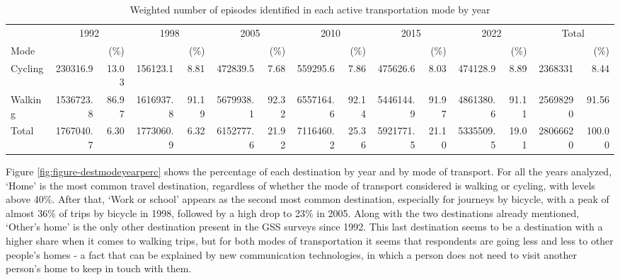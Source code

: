 \documentclass[preprint, 3p,
authoryear]{elsarticle} %
\begin{document}
\begingroup\fontsize{6}{8}\selectfont

\begin{longtable}[t]{lrrrrrrrrrrrrrr}
\caption{\label{tab:bulding table-01}\label{tab:episodes-count-percentages}Weighted number of episodes identified in each active transportation mode by year}\\
\toprule
\multicolumn{1}{c}{ } & \multicolumn{2}{c}{1992} & \multicolumn{2}{c}{1998} & \multicolumn{2}{c}{2005} & \multicolumn{2}{c}{2010} & \multicolumn{2}{c}{2015} & \multicolumn{2}{c}{2022} & \multicolumn{2}{c}{Total} \\
\cmidrule(l{3pt}r{3pt}){2-3} \cmidrule(l{3pt}r{3pt}){4-5} \cmidrule(l{3pt}r{3pt}){6-7} \cmidrule(l{3pt}r{3pt}){8-9} \cmidrule(l{3pt}r{3pt}){10-11} \cmidrule(l{3pt}r{3pt}){12-13} \cmidrule(l{3pt}r{3pt}){14-15}
Mode &  & (\%) &  & (\%) &  & (\%) &  & (\%) &  & (\%) &  & (\%) &  & (\%)\\
\midrule
Cycling & 230316.9 & 13.03 & 156123.1 & 8.81 & 472839.5 & 7.68 & 559295.6 & 7.86 & 475626.6 & 8.03 & 474128.9 & 8.89 & 2368331 & 8.44\\
Walking & 1536723.8 & 86.97 & 1616937.8 & 91.19 & 5679938.1 & 92.32 & 6557164.6 & 92.14 & 5446144.9 & 91.97 & 4861380.6 & 91.11 & 25698290 & 91.56\\
Total & 1767040.7 & 6.30 & 1773060.9 & 6.32 & 6152777.6 & 21.92 & 7116460.2 & 25.36 & 5921771.5 & 21.10 & 5335509.5 & 19.01 & 28066620 & 100.00\\
\bottomrule
\end{longtable}
\endgroup{}

Figure \ref{fig:figure-destmodeyearperc} shows the percentage of each
destination by year and by mode of transport. For all the years
analyzed, `Home' is the most common travel destination, regardless of
whether the mode of transport considered is walking or cycling, with
levels above 40\%. After that, `Work or school' appears as the second
most common destination, especially for journeys by bicycle, with a peak
of almost 36\% of trips by bicycle in 1998, followed by a high drop to
23\% in 2005. Along with the two destinations already mentioned,
`Other's home' is the only other destination present in the GSS surveys
since 1992. This last destination seems to be a destination with a
higher share when it comes to walking trips, but for both modes of
transportation it seems that respondents are going less and less to
other people's homes - a fact that can be explained by new communication
technologies, in which a person does not need to visit another person's
home to keep in touch with them.
\end{document}
